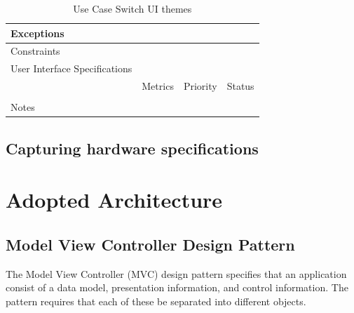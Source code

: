 \begin{table}[H]
\begin{tabularx}{\linewidth}{|l|X|X|X|}
            \hline Exceptions                    & \multicolumn{3}{l|}{}                                                                                 \\

            \hline Constraints                   & \multicolumn{3}{l|}{}                                                                                 \\

            \hline User Interface Specifications & \multicolumn{3}{l|}{}                                                                                 \\

            \hline \multirow{2}{*}{}             & Metrics                                                                           & Priority & Status \\
            \cline{2-4}                          &                                                                                   &          &        \\
            \hline Notes                         & \multicolumn{3}{l|}{}                                                                                 \\
            \hline
      \end{tabularx}
      \caption{Use Case Switch UI themes}
      \label{tab:use_case_switch_ui_themes}
\end{table}



\subsection{Capturing hardware specifications}


\section{Adopted Architecture}

\subsection{Model View Controller Design Pattern}

The Model View Controller (MVC) design pattern specifies that an application consist of a data model, presentation information, and control information. The pattern requires that each of these be separated into different objects.

